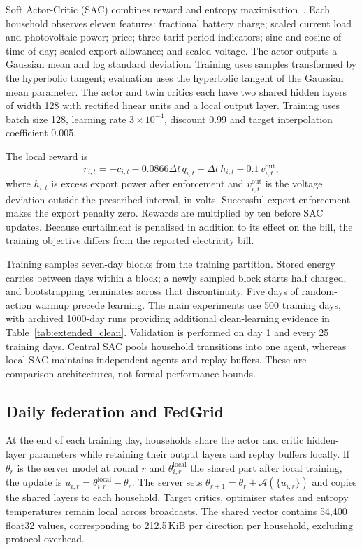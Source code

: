 Soft Actor-Critic (SAC) combines reward and entropy maximisation~\cite{sac,sacapps}. Each household observes eleven features: fractional battery charge; scaled current load and photovoltaic power; price; three tariff-period indicators; sine and cosine of time of day; scaled export allowance; and scaled voltage. The actor outputs a Gaussian mean and log standard deviation. Training uses samples transformed by the hyperbolic tangent; evaluation uses the hyperbolic tangent of the Gaussian mean parameter. The actor and twin critics each have two shared hidden layers of width 128 with rectified linear units and a local output layer. Training uses batch size 128, learning rate $3\times10^{-4}$, discount 0.99 and target interpolation coefficient 0.005.

The local reward is
\begin{equation}
r_{i,t}=-c_{i,t}-0.0866\Delta t\,q_{i,t}
-\Delta t\,h_{i,t}-0.1\,v^{\mathrm{out}}_{i,t},
\end{equation}
where $h_{i,t}$ is excess export power after enforcement and $v^{\mathrm{out}}_{i,t}$ is the voltage deviation outside the prescribed interval, in volts. Successful export enforcement makes the export penalty zero. Rewards are multiplied by ten before SAC updates. Because curtailment is penalised in addition to its effect on the bill, the training objective differs from the reported electricity bill.

Training samples seven-day blocks from the training partition. Stored energy carries between days within a block; a newly sampled block starts half charged, and bootstrapping terminates across that discontinuity. Five days of random-action warmup precede learning. The main experiments use 500 training days, with archived 1000-day runs providing additional clean-learning evidence in Table~\ref{tab:extended_clean}. Validation is performed on day 1 and every 25 training days. Central SAC pools household transitions into one agent, whereas local SAC maintains independent agents and replay buffers. These are comparison architectures, not formal performance bounds.

\subsection{Daily federation and FedGrid}
At the end of each training day, households share the actor and critic hidden-layer parameters while retaining their output layers and replay buffers locally. If $\theta_r$ is the server model at round $r$ and $\theta_{i,r}^{\mathrm{local}}$ the shared part after local training, the update is $u_{i,r}=\theta_{i,r}^{\mathrm{local}}-\theta_r$. The server sets $\theta_{r+1}=\theta_r+\mathcal A(\{u_{i,r}\})$ and copies the shared layers to each household. Target critics, optimiser states and entropy temperatures remain local across broadcasts. The shared vector contains 54,400 float32 values, corresponding to 212.5\,KiB per direction per household, excluding protocol overhead.

